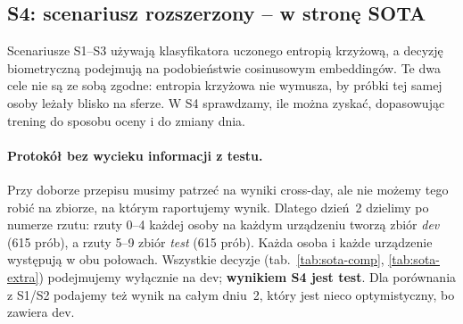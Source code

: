 \subsection{S4: scenariusz rozszerzony -- w stronę SOTA}\label{sec:sota}
Scenariusze S1--S3 używają klasyfikatora uczonego entropią krzyżową, a decyzję biometryczną
podejmują na podobieństwie cosinusowym embeddingów. Te dwa cele nie są ze sobą zgodne: entropia
krzyżowa nie wymusza, by próbki tej samej osoby leżały blisko na sferze. W S4 sprawdzamy, ile
można zyskać, dopasowując trening do sposobu oceny i do zmiany dnia.

\paragraph{Protokół bez wycieku informacji z testu.} Przy doborze przepisu musimy patrzeć na wyniki
cross-day, ale nie możemy tego robić na zbiorze, na którym raportujemy wynik. Dlatego dzień~2
dzielimy po numerze rzutu: rzuty 0--4 każdej osoby na każdym urządzeniu tworzą zbiór \emph{dev}
(615 prób), a rzuty 5--9 zbiór \emph{test} (615 prób). Każda osoba i każde urządzenie występują w obu
połowach. Wszystkie decyzje (tab.~\ref{tab:sota-comp}, \ref{tab:sota-extra}) podejmujemy wyłącznie
na dev; \textbf{wynikiem S4 jest test}. Dla porównania z S1/S2 podajemy też wynik na całym dniu~2,
który jest nieco optymistyczny, bo zawiera dev.


